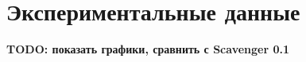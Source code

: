 \chapter{Экспериментальные данные}
\startrelatedwork

\textbf{TODO: показать графики, сравнить с Scavenger 0.1}
